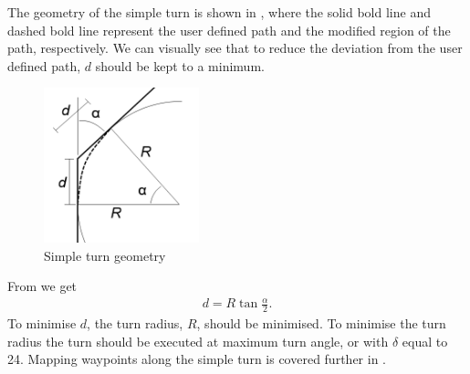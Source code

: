 \documentclass[main.tex]{subfiles}
\begin{document}
The geometry of the simple turn is shown in , where the solid bold line and dashed bold line represent the user defined path and the modified region of the path, respectively. We can visually see that to reduce the deviation from the user defined path, $d$ should be kept to a minimum.
\begin{figure}[ht]
\includegraphics[width=0.4\textwidth]{4-DetailedDesign/simpleTurnGeometry.png}
\centering
\caption{Simple turn geometry} 
\end{figure} 
From  we get
\begin{align}
d = R \tan{\frac{\alpha}{2}}.
\end{align}
To minimise $d$, the turn radius, $R$, should be minimised. To minimise the turn radius the turn should be executed at maximum turn angle, or with $\delta$ equal to 24\degree. Mapping waypoints along the simple turn is covered further in .
\end{document}
